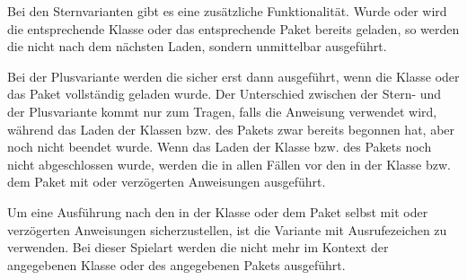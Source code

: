 Bei den
Sternvarianten gibt es eine zusätzliche Funktionalität. Wurde oder wird die
entsprechende Klasse oder das entsprechende Paket bereits geladen, so werden
die  nicht nach dem nächsten Laden, sondern unmittelbar
ausgeführt.

Bei der
Plusvariante werden die
 sicher erst dann ausgeführt, wenn die Klasse oder das
Paket vollständig geladen wurde. Der Unterschied zwischen der Stern- und der
Plusvariante kommt nur zum Tragen, falls die Anweisung verwendet wird, während
das Laden der Klassen bzw. des Pakets zwar bereits begonnen hat, aber noch
nicht beendet wurde. Wenn das Laden der Klasse bzw. des Pakets noch nicht
abgeschlossen wurde, werden die  in allen Fällen vor den in
der Klasse bzw. dem Paket mit  oder 
verzögerten Anweisungen ausgeführt.

Um eine Ausführung
nach den in der Klasse oder dem Paket selbst mit  oder
 verzögerten Anweisungen sicherzustellen, ist die
Variante mit Ausrufezeichen zu
verwenden. Bei dieser Spielart werden die  nicht mehr im
Kontext der angegebenen Klasse oder des angegebenen Pakets ausgeführt.

